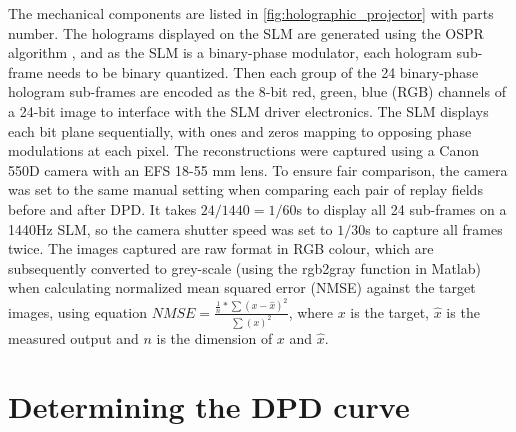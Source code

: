 The mechanical components are listed in \cref{fig:holographic_projector} with parts number. The holograms displayed on the SLM are generated using the OSPR algorithm \cite{Cable2004}, and as the SLM is a binary-phase modulator, each hologram sub-frame needs to be binary quantized. Then each group of the 24 binary-phase hologram sub-frames are encoded as the 8-bit red, green, blue (RGB) channels of a 24-bit image to interface with the SLM driver electronics. The SLM displays each bit plane sequentially, with ones and zeros mapping to opposing phase modulations at each pixel. The reconstructions were captured using a Canon 550D camera with an EFS 18-55 mm lens. To ensure fair comparison, the camera was set to the same manual setting when comparing each pair of replay fields before and after DPD. It takes $24/1440=1/60$s to display all 24 sub-frames on a 1440Hz SLM, so the camera shutter speed was set to $1/30$s to capture all frames twice. The images captured are raw format in RGB colour, which are subsequently converted to grey-scale (using the rgb2gray function in Matlab\cite{MATLAB}) when calculating normalized mean squared error (NMSE) against the target images, using equation $NMSE = \frac{\frac{1}{n} * \sum (x - \hat{x})^2}{\sum (x)^2}$, where $x$ is the target, $\hat{x}$ is the measured output and $n$ is the dimension of $x$ and $\hat{x}$.



\section{Determining the DPD curve}

